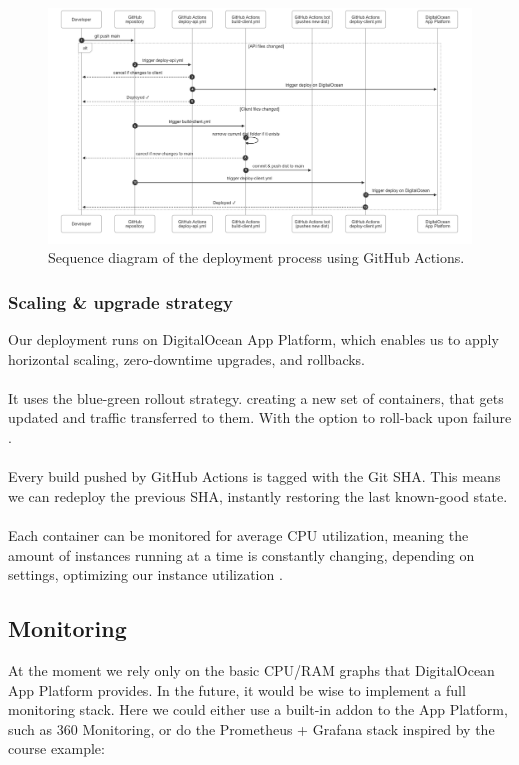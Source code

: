 \begin{figure}[H]
    \centering
    \includegraphics[width=1\linewidth]{images/DeploymentSequence.png}
    \caption{Sequence diagram of the deployment process using GitHub Actions.}
    \label{fig:DeploymentSequence}
\end{figure}

\subsubsection{Scaling \& upgrade strategy}
Our deployment runs on DigitalOcean App Platform, which enables us to apply horizontal scaling, zero-downtime upgrades, and rollbacks.
\\\\
It uses the blue-green rollout strategy. creating a new set of containers, that gets updated and traffic transferred to them. With the option to roll-back upon failure \cite{rollbacks}.
\\\\
Every build pushed by GitHub Actions is tagged with
the Git SHA. This means we can redeploy the previous SHA, instantly restoring the last known-good state.
\\\\
Each container can be monitored for average CPU utilization, meaning the amount of instances running at a time is constantly changing, depending on settings, optimizing our instance utilization \cite{app_scaling}.

\subsection{Monitoring}
At the moment we rely only on the basic CPU/RAM graphs that DigitalOcean App Platform provides. In the future, it would be wise to implement a full monitoring stack. Here we could either use a built-in addon to the App Platform, such as 360 Monitoring, or do the Prometheus + Grafana stack inspired by the course example:

